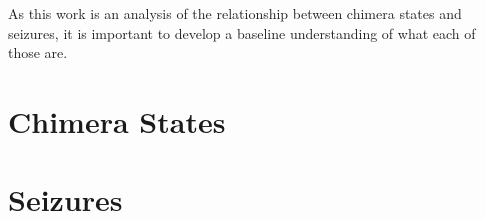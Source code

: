As this work is an analysis of the relationship between chimera states and seizures, it is important to develop a baseline understanding of what each of those are.
\section{Chimera States}
\label{sec:intro_chimera}


\section{Seizures}
\label{sec:intro_seizures}

